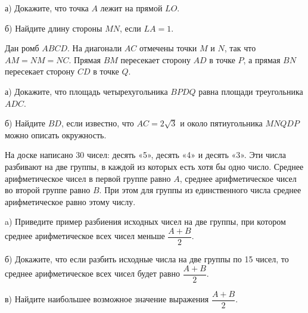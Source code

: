 а) Докажите, что точка $A$ лежит на прямой $LO$.

б) Найдите длину стороны $MN$, если $LA=1$.

 Дан ромб $A B C D$. На диагонали $A C$ отмечены точки $M$ и $N$, так что $A M=N M=N C$. Прямая $B M$ пересекает сторону $A D$ в точке $P$, а прямая $B N$ пересекает сторону $C D$ в точке $Q$.

а) Докажите, что площадь четырехугольника $B P D Q$ равна площади треугольника $A D C$.

б) Найдите $B D$, если известно, что $A C=2 \sqrt{3}$ и около пятиугольника $M N Q D P$ можно описать окружность.

 На доске написано 30 чисел: десять «5», десять «4» и десять «3». Эти числа разбивают на две группы, в каждой из которых есть хотя бы одно число. Среднее арифметическое чисел в первой группе равно $A$, среднее арифметическое чисел во второй группе равно $B$. При этом для группы из единственного числа среднее арифметическое равно этому числу.

a) Приведите пример разбиения исходных чисел на две группы, при котором среднее арифметическое всех чисел меньше $\dfrac{A+B}{2}$.

б) Докажите, что если разбить исходные числа на две группы по 15 чисел, то среднее арифметическое всех чисел будет равно $\dfrac{A+B}{2}$.

в) Найдите наибольшее возможное значение выражения $\dfrac{A+B}{2}$.